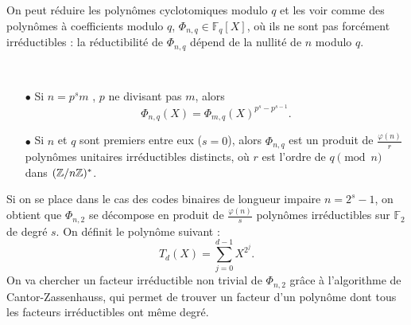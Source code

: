 \\
\\

On peut réduire les polynômes cyclotomiques modulo $q$ et les voir comme des polynômes à coefficients modulo $q$, $\Phi_{n,q}\in\mathbb F_q[X]$, où ils ne sont pas forcément irréductibles : la réductibilité de $\Phi_{n,q}$ dépend de la nullité de $n$ modulo $q$.\\
\begin{prop}\
\begin{itemize}
\item[$\bullet$] Si $n=p^s m$ , $p$ ne divisant pas $m$, alors \[\Phi_{n,q}(X) = \Phi_{m,q}(X)^{p^s-p^{s-1}}.\]
\item[$\bullet$] Si $n$ et $q$ sont premiers entre eux ($s=0$), alors $\Phi_{n,q}$ est un produit de $\frac{\varphi(n)}{r}$ polynômes unitaires irréductibles distincts, où $r$ est l'ordre de $q \pmod n $ dans $(\mathbb Z/n\mathbb Z)^*$.
\end{itemize}
\end{prop}

Si on se place dans le cas des codes binaires de longueur impaire $n=2^s-1$, on obtient que $\Phi_{n,2}$ se décompose en produit de $\frac{\varphi(n)}{s}$ polynômes irréductibles sur $\mathbb F_2$ de degré $s$. On définit le polynôme suivant :
\[T_d(X)= \sum_{j=0}^{d-1} X^{2^j}.\]
On va chercher un facteur irréductible non trivial de $\Phi_{n,2}$ grâce à l'algorithme de Cantor-Zassenhauss, qui permet de trouver un facteur d'un polynôme dont tous les facteurs irréductibles ont même degré. 

